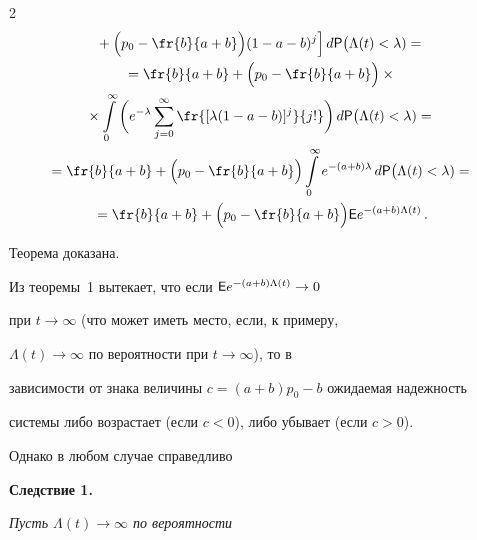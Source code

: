 \begin{multicols}{2}
\begin{multline*}
{}+ \Big(p_0-\fr{b}{a+b}\Big)


(1-a-b)^j\Big]\,d{\sf P}\big(\Lambda(t)<\lambda)=


{}\\


{}


=\fr{b}{a+b}+\Big(p_0-\fr{b}{a+b}\Big)\times{}\\


{}\times \int\limits_{0}^{\infty}\bigg(e^{-\lambda}


\sum_{j=0}^{\infty}\fr{[\lambda(1-a-b)]^j}{j!}\bigg)\,d{\sf


P}\big(\Lambda(t)<\lambda)=


{}\\


{}


=\fr{b}{a+b}+\Big(p_0-\fr{b}{a+b}\Big)\int\limits_{0}^{\infty}e^{-(a+b)\lambda}\,d{\sf


P}\big(\Lambda(t)<\lambda)={}\\


{}


=\fr{b}{a+b}+\Big(p_0-\fr{b}{a+b}\Big){\sf


E}e^{-(a+b)\Lambda(t)}\,.


\end{multline*}


Теорема доказана.





\smallskip





Из теоремы~1 вытекает, что если ${\sf E}e^{-(a+b)\Lambda(t)}\to 0$


при $t\to\infty$ (что может иметь место, если, к примеру,


$\Lambda(t)\to\infty$ по вероятности при $t\to\infty$), то в


зависимости от знака величины $c=(a+b)p_0-b$ ожидаемая надежность


системы либо возрастает (если $c<0$), либо убывает (если $c>0$).


Однако в любом случае справедливо





\smallskip





\noindent


{\textbf{Следствие 1.}} {\it Пусть $\Lambda(t)\to\infty$ по вероятности


}
\end{multicols}
